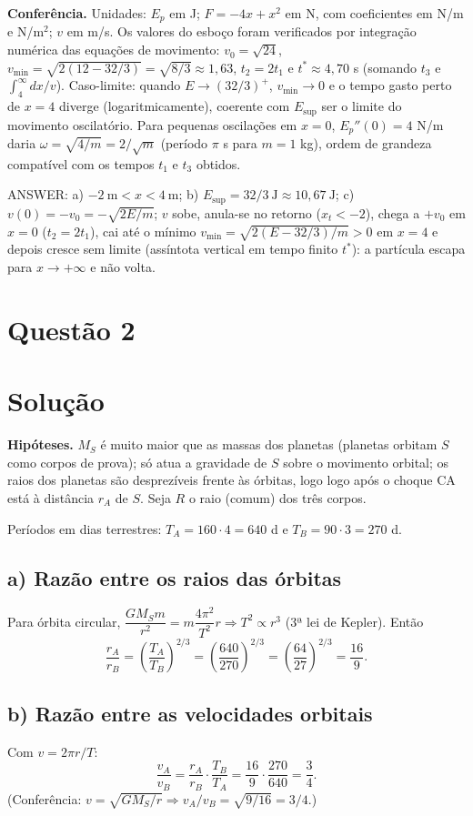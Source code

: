 \documentclass{article}%
\begin{document}
\textbf{Conferência.} Unidades: $E_p$ em J; $F=-4x+x^2$ em N, com coeficientes em N/m e N/m$^2$; $v$ em m/s. Os valores do esboço foram verificados por integração numérica das equações de movimento: $v_0=\sqrt{24}$, $v_{\min}=\sqrt{2(12-32/3)}=\sqrt{8/3}\approx1{,}63$, $t_2=2t_1$ e $t^*\approx4{,}70$ s (somando $t_3$ e $\int_4^\infty dx/v$). Caso-limite: quando $E\to(32/3)^+$, $v_{\min}\to0$ e o tempo gasto perto de $x=4$ diverge (logaritmicamente), coerente com $E_{\sup}$ ser o limite do movimento oscilatório. Para pequenas oscilações em $x=0$, $E_p''(0)=4$ N/m daria $\omega=\sqrt{4/m}=2/\sqrt m$ (período $\pi$ s para $m=1$ kg), ordem de grandeza compatível com os tempos $t_1$ e $t_3$ obtidos.

\medskip
\noindent ANSWER: a) $-2\ \text{m}<x<4\ \text{m}$; b) $E_{\sup}=32/3\ \text{J}\approx10{,}67\ \text{J}$; c) $v(0)=-v_0=-\sqrt{2E/m}$; $v$ sobe, anula-se no retorno ($x_t<-2$), chega a $+v_0$ em $x=0$ ($t_2=2t_1$), cai até o mínimo $v_{\min}=\sqrt{2(E-32/3)/m}>0$ em $x=4$ e depois cresce sem limite (assíntota vertical em tempo finito $t^*$): a partícula escapa para $x\to+\infty$ e não volta.%
\newpage%
\section*{Questão 2}

\section*{Solução}

\textbf{Hipóteses.} $M_S$ é muito maior que as massas dos planetas (planetas orbitam $S$ como corpos de prova); só atua a gravidade de $S$ sobre o movimento orbital; os raios dos planetas são desprezíveis frente às órbitas, logo logo após o choque CA está à distância $r_A$ de $S$. Seja $R$ o raio (comum) dos três corpos.

Períodos em dias terrestres: $T_A=160\cdot 4=640$ d e $T_B=90\cdot 3=270$ d.

\subsection*{a) Razão entre os raios das órbitas}
Para órbita circular, $\dfrac{GM_Sm}{r^2}=m\dfrac{4\pi^2}{T^2}r\Rightarrow T^2\propto r^3$ (3ª lei de Kepler). Então
\[
\frac{r_A}{r_B}=\left(\frac{T_A}{T_B}\right)^{2/3}=\left(\frac{640}{270}\right)^{2/3}=\left(\frac{64}{27}\right)^{2/3}=\frac{16}{9}.
\]

\subsection*{b) Razão entre as velocidades orbitais}
Com $v=2\pi r/T$:
\[
\frac{v_A}{v_B}=\frac{r_A}{r_B}\cdot\frac{T_B}{T_A}=\frac{16}{9}\cdot\frac{270}{640}=\frac{3}{4}.
\]
(Conferência: $v=\sqrt{GM_S/r}\Rightarrow v_A/v_B=\sqrt{9/16}=3/4$.)
\end{document}
